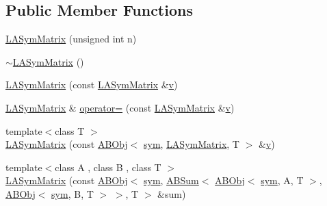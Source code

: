 \subsection*{Public Member Functions}
\begin{DoxyCompactItemize}
\item 
\mbox{\hyperlink{classROOT_1_1Minuit2_1_1LASymMatrix_a9fe58788095d0860bb44bde53457782c}{L\+A\+Sym\+Matrix}} (unsigned int n)
\item 
\mbox{\hyperlink{classROOT_1_1Minuit2_1_1LASymMatrix_a6de4c2f5940002a13411348985d1b784}{$\sim$\+L\+A\+Sym\+Matrix}} ()
\item 
\mbox{\hyperlink{classROOT_1_1Minuit2_1_1LASymMatrix_ac74006982da0bcda789c1237e0022033}{L\+A\+Sym\+Matrix}} (const \mbox{\hyperlink{classROOT_1_1Minuit2_1_1LASymMatrix}{L\+A\+Sym\+Matrix}} \&\mbox{\hyperlink{adat__devel_2lib_2hadron_2hadron__timeslice_8cc_a716fc87f5e814be3ceee2405ed6ff22a}{v}})
\item 
\mbox{\hyperlink{classROOT_1_1Minuit2_1_1LASymMatrix}{L\+A\+Sym\+Matrix}} \& \mbox{\hyperlink{classROOT_1_1Minuit2_1_1LASymMatrix_a31521afba8179a28e7744af51850922e}{operator=}} (const \mbox{\hyperlink{classROOT_1_1Minuit2_1_1LASymMatrix}{L\+A\+Sym\+Matrix}} \&\mbox{\hyperlink{adat__devel_2lib_2hadron_2hadron__timeslice_8cc_a716fc87f5e814be3ceee2405ed6ff22a}{v}})
\item 
{\footnotesize template$<$class T $>$ }\\\mbox{\hyperlink{classROOT_1_1Minuit2_1_1LASymMatrix_ab44b18a4c1b65cb054c884661843a4a0}{L\+A\+Sym\+Matrix}} (const \mbox{\hyperlink{classROOT_1_1Minuit2_1_1ABObj}{A\+B\+Obj}}$<$ \mbox{\hyperlink{classROOT_1_1Minuit2_1_1sym}{sym}}, \mbox{\hyperlink{classROOT_1_1Minuit2_1_1LASymMatrix}{L\+A\+Sym\+Matrix}}, T $>$ \&\mbox{\hyperlink{adat__devel_2lib_2hadron_2hadron__timeslice_8cc_a716fc87f5e814be3ceee2405ed6ff22a}{v}})
\item 
{\footnotesize template$<$class A , class B , class T $>$ }\\\mbox{\hyperlink{classROOT_1_1Minuit2_1_1LASymMatrix_a50f5a1e686ba0b5ac1d296432bdea484}{L\+A\+Sym\+Matrix}} (const \mbox{\hyperlink{classROOT_1_1Minuit2_1_1ABObj}{A\+B\+Obj}}$<$ \mbox{\hyperlink{classROOT_1_1Minuit2_1_1sym}{sym}}, \mbox{\hyperlink{classROOT_1_1Minuit2_1_1ABSum}{A\+B\+Sum}}$<$ \mbox{\hyperlink{classROOT_1_1Minuit2_1_1ABObj}{A\+B\+Obj}}$<$ \mbox{\hyperlink{classROOT_1_1Minuit2_1_1sym}{sym}}, A, T $>$, \mbox{\hyperlink{classROOT_1_1Minuit2_1_1ABObj}{A\+B\+Obj}}$<$ \mbox{\hyperlink{classROOT_1_1Minuit2_1_1sym}{sym}}, B, T $>$ $>$, T $>$ \&sum)

\end{DoxyCompactItemize}
